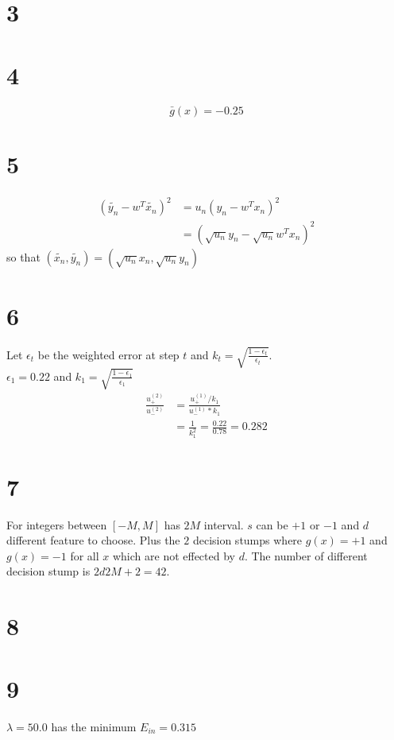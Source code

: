 \documentclass[12pt]{article}
\begin{document}
\section*{3}


\section*{4}
\[
\bar{g}(x) = -0.25    
\]
\section*{5}

\begin{equation*}
\begin{split}
    (\tilde{y_n} - w^T \tilde{x_n})^2 &= u_n (y_n - w^Tx_n)^2 \\
    &=  (\sqrt{u_n} y_n - \sqrt{u_n}w^Tx_n)^2
\end{split}
\end{equation*}
so that $(\tilde{x_n}, \tilde{y_n}) = (\sqrt{u_n}x_n, \sqrt{u_n}y_n)$

\section*{6}
Let $\epsilon_t$ be the weighted error at step $t$ and $k_t = \sqrt{\frac{1- \epsilon_t}{\epsilon_t}}$. \\
$\epsilon_1 = 0.22$ and $k_1 = \sqrt{\frac{1- \epsilon_1}{\epsilon_1}}$
\begin{equation*}
\begin{split}
    \frac{u_+^{(2)}} {u_-^{(2)}} &= \frac{u_+^{(1)} / k_1 } {u_-^{(1)} * k_1} \\
    &= \frac{1}{k_1^2} = \frac{0.22}{0.78} = 0.282
\end{split}
\end{equation*}

\section*{7}
For integers between $[-M, M]$ has $2M$ interval. $s$ can be $+1$ or $-1$ and $d$ different feature to choose.
Plus the $2$ decision stumps where $g(x)=+1$ and $g(x)=-1$ for all $x$ which are not effected by $d$. 
The number of different decision stump is $2d 2M+2=42$. 
\section*{8}

\section*{9}
$\lambda = 50.0$ has the minimum $E_{in} = 0.315$
\end{document}
